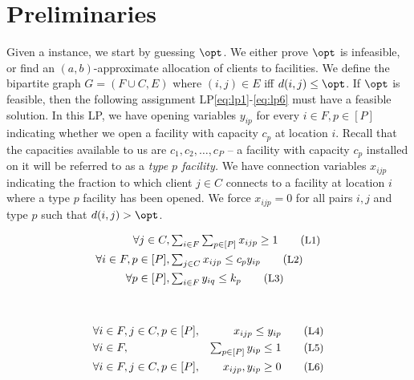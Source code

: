 \section{Preliminaries}\label{sec:prelims}
Given a \mckc instance, we start by guessing $\opt$. We either prove $\opt$ is infeasible, or find an $(a,b)$-approximate allocation of clients to facilities.
	We define the bipartite graph $G = (F\cup C,E)$ where $(i,j)\in E$ iff $d(i,j) \leq \opt$. If $\opt$ is feasible, then the following assignment LP\eqref{eq:lp1}-\eqref{eq:lp6}
	must have a feasible solution.
In this LP, we  have opening  variables $y_{ip}$ for every $i\in F,p\in [P]$ indicating whether we open a facility with capacity $c_p$ at location $i$. Recall that the capacities available to us are $c_1, c_2, \ldots, c_P$ -- a facility with
capacity $c_p$ installed on it will be referred to as a {\em type $p$ facility.}
	We have connection variables $x_{ijp}$ indicating the fraction to which client $j\in C$ connects to a facility at location $i$ where a type $p$ facility has been opened.
	We force $x_{ijp} = 0$ for all pairs $i,j$ and type $p$ such that  $d(i,j) > \opt$.
	
		
		\begin{minipage}{0.49\textwidth}
			\begin{alignat*}{2}
				 \forall j\in C,   &\textstyle \sum_{i\in F} \sum_{p\in [P]}  x_{ijp} \geq 1 \label{eq:lp1} \tag{\small{L1}}  \\
				 \forall i\in F,p\in [P] ,  &\textstyle \sum_{j\in C}  x_{ijp} \leq c_py_{ip} \label{eq:lp2} \tag{\small{L2}} \\
				 \forall p\in [P], & \textstyle \sum_{i\in F} y_{iq}   \leq k_p \label{eq:lp3}  \tag{\small{L3}}
			\end{alignat*}
		\end{minipage}
		~\vline~
		\begin{minipage}{0.49\textwidth}
			\begin{alignat*}{3}
				&\forall i\in F, j\in C,p\in [P],  & x_{ijp} \leq y_{ip}\label{eq:lp4}   \tag{\small{L4}} \\
				& \forall i\in F, & \textstyle\sum_{p\in [P]} y_{ip} \leq 1 \label{eq:lp5}  \tag{\small{L5}} \\
				& \forall i\in F,j\in C,p\in [P], & x_{ijp},y_{ip} \geq 0\label{eq:lp6}\tag{\small{L6}}
			\end{alignat*}
		\end{minipage}
\smallskip

